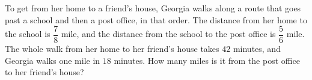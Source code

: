 To get from her home to a friend's house, Georgia walks along a route that goes past a school and then a post office, in that order. The distance from her home to the school is $\dfrac78$ mile, and the distance from the school to the post office is $\dfrac56$ mile. The whole walk from her home to her friend's house takes $42$ minutes, and Georgia walks one mile in $18$ minutes. How many miles is it from the post office to her friend's house?
